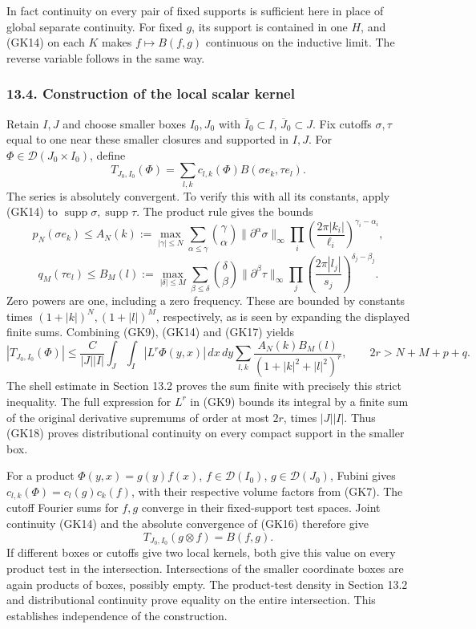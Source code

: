 \documentclass[
  11pt,
]{article}
\begin{document}
In fact continuity on every pair of fixed supports is sufficient here in
place of global separate continuity. For fixed \(g\), its support is
contained in one \(H\), and (GK14) on each \(K\) makes
\(f\mapsto B(f,g)\) continuous on the inductive limit. The reverse
variable follows in the same way.

\subsubsection{13.4. Construction of the local scalar
kernel}\label{construction-of-the-local-scalar-kernel}

Retain \(I,J\) and choose smaller boxes \(I_0,J_0\) with
\(\overline I_0\subset I\), \(\overline J_0\subset J\). Fix cutoffs
\(\sigma,\tau\) equal to one near these smaller closures and supported
in \(I,J\). For \(\Phi\in\mathcal D(J_0\times I_0)\), define \[
 T_{J_0,I_0}(\Phi)=\sum_{l,k}c_{l,k}(\Phi)
                          B(\sigma e_k,\tau e_l).
 \tag{GK16}
\] The series is absolutely convergent. To verify this with all its
constants, apply (GK14) to
\(\operatorname{supp}\sigma,\operatorname{supp}\tau\). The product rule
gives the bounds \[
 p_N(\sigma e_k)\leq A_N(k):=
 \max_{|\gamma|\leq N}
 \sum_{\alpha\leq\gamma}\binom{\gamma}{\alpha}
 \|\partial^\alpha\sigma\|_\infty
 \prod_i\left(\frac{2\pi|k_i|}{\ell_i}\right)^{\gamma_i-\alpha_i},
\] \[
 q_M(\tau e_l)\leq B_M(l):=
 \max_{|\delta|\leq M}
 \sum_{\beta\leq\delta}\binom{\delta}{\beta}
 \|\partial^\beta\tau\|_\infty
 \prod_j\left(\frac{2\pi|l_j|}{s_j}\right)^{\delta_j-\beta_j}.
 \tag{GK17}
\] Zero powers are one, including a zero frequency. These are bounded by
constants times \((1+|k|)^N,(1+|l|)^M\), respectively, as is seen by
expanding the displayed finite sums. Combining (GK9), (GK14) and (GK17)
yields \[
 |T_{J_0,I_0}(\Phi)|
 \leq \frac{C}{|J||I|}
       \int_J\int_I|L^r\Phi(y,x)|\,dx\,dy
       \sum_{l,k}\frac{A_N(k)B_M(l)}
                         {(1+|k|^2+|l|^2)^r},
 \qquad 2r>N+M+p+q.
 \tag{GK18}
\] The shell estimate in Section 13.2 proves the sum finite with
precisely this strict inequality. The full expression for \(L^r\) in
(GK9) bounds its integral by a finite sum of the original derivative
supremums of order at most \(2r\), times \(|J||I|\). Thus (GK18) proves
distributional continuity on every compact support in the smaller box.

For a product \(\Phi(y,x)=g(y)f(x)\), \(f\in\mathcal D(I_0)\),
\(g\in\mathcal D(J_0)\), Fubini gives \(c_{l,k}(\Phi)=c_l(g)c_k(f)\),
with their respective volume factors from (GK7). The cutoff Fourier sums
for \(f,g\) converge in their fixed-support test spaces. Joint
continuity (GK14) and the absolute convergence of (GK16) therefore give
\[
 T_{J_0,I_0}(g\otimes f)=B(f,g).
 \tag{GK19}
\] If different boxes or cutoffs give two local kernels, both give this
value on every product test in the intersection. Intersections of the
smaller coordinate boxes are again products of boxes, possibly empty.
The product-test density in Section 13.2 and distributional continuity
prove equality on the entire intersection. This establishes independence
of the construction.
\end{document}

